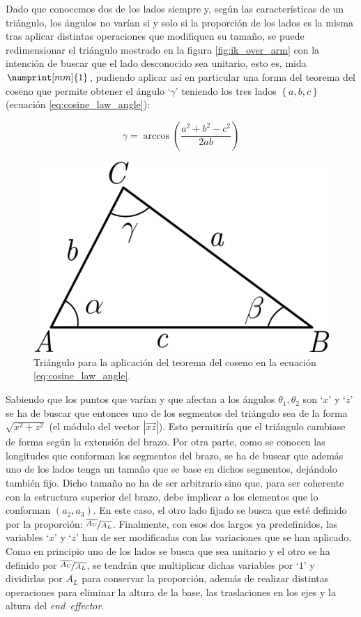 Dado que conocemos dos de los lados siempre y, según las características de un triángulo,
los ángulos no varían si y solo si la proporción de los lados es la misma tras aplicar
distintas operaciones que modifiquen su tamaño, se puede redimensionar el triángulo
mostrado en la figura \ref{fig:ik_over_arm} con la intención de buscar que el lado
desconocido sea unitario, esto es, mida $\numprint[mm]{1}$, pudiendo aplicar así en particular una forma del
teorema del coseno que permite obtener el ángulo `$\gamma$' teniendo los tres lados $\left\{a,b,c\right\}$
(ecuación \ref{eq:cosine_law_angle}):

\begin{equation}\label{eq:cosine_law_angle}
    \gamma = \arccos{\left(\frac{a^2 + b^2 - c^2}{2ab}\right)}
\end{equation}

\begin{figure}[H]
    \centering
    \includegraphics[width=.3\linewidth]{pictures/cosine_law.png}
    \caption{Triángulo para la aplicación del teorema del coseno en la ecuación \ref{eq:cosine_law_angle}.}
    \label{fig:cosine_law_triangle}
\end{figure}

Sabiendo que los puntos que varían y que afectan a los ángulos
$\theta_1, \theta_2$ son `$x$' y `$z$' se ha de buscar que entonces uno de los segmentos
del triángulo sea de la forma $\sqrt{x^2 + z^2}$ (el módulo del vector $\left|{\overrightarrow{xz}}\right|$).
Esto permitiría que el triángulo cambiase de forma según la extensión del brazo.
Por otra parte, como se conocen las longitudes que conforman los segmentos del brazo, se
ha de buscar que además uno de los lados tenga un tamaño que se base en dichos segmentos,
dejándolo también fijo. Dicho tamaño no ha de ser arbitrario sino que, para ser coherente
con la estructura superior del brazo, debe implicar a los elementos que lo conforman
$\left(a_2, a_3\right)$.
En este caso, el otro lado fijado se busca que esté definido por la proporción:
$\nicefrac{\overline{A_U}}{\overline{A_L}}$.
Finalmente, con esos dos largos ya predefinidos, las variables `$x$' y `$z$' han de ser
modificadas con las variaciones que se han aplicado. Como en principio
uno de los lados se busca que sea unitario y el otro se ha definido por $\nicefrac{\overline{A_U}}{\overline{A_L}}$,
se tendrán que multiplicar dichas variables por `$1$' y dividirlas por $\overline{A_L}$
para conservar la proporción, además de realizar distintas operaciones para eliminar
la altura de la base, las traslaciones en los ejes y la altura del \textit{end--effector}.


